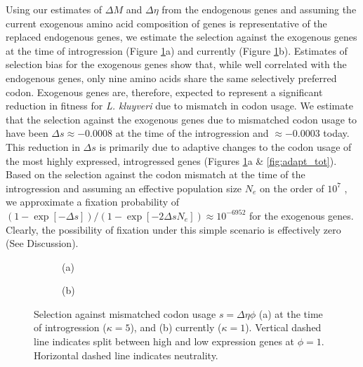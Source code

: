 \documentclass{bmcart}
\def\texttt{[image: ]}
\newcommand{\kluyveri}{\textit{L. kluyveri}\xspace}
\newcommand{\DE}{\ensuremath{{\Delta \eta}}\xspace}
\newcommand{\Ne}{\ensuremath{N_e}\xspace}
\newcommand{\GL}{\ensuremath{{\Delta s}}\xspace}
\begin{document}
Using our estimates of $\Delta M$ and $\Delta \eta$ from the endogenous genes and assuming the current exogenous amino acid composition of genes is representative of the replaced endogenous genes, we estimate the selection against the exogenous genes at the time of introgression (Figure \ref{fig:sne_fitness_burden}a) and currently (Figure \ref{fig:sne_fitness_burden}b).
Estimates of selection bias for the exogenous genes show that, while well correlated with the endogenous genes, only nine amino acids share the same selectively preferred codon.
Exogenous genes are, therefore, expected to represent a significant reduction in fitness for \kluyveri due to mismatch in codon usage.
We estimate that the selection against the exogenous genes due to mismatched codon usage to have been $\GL \approx -0.0008$ at the time of the introgression and $\approx -0.0003$ today.
This reduction in $\GL$ is primarily due to adaptive changes to the codon usage of the most highly expressed, introgressed genes (Figures \ref{fig:sne_fitness_burden}a \& \ref{fig:adapt_tot}).
Based on the selection against the codon mismatch at the time of the introgression and assuming an effective population size $\Ne$ on the order of $10^7$ \citep{wagner2005}, we approximate a fixation probability of $(1-\exp[-\GL])/(1-\exp[-2\GL \Ne]) \approx 10^{-6952}$ \citep{SellaAndHirsh2005} for the exogenous genes.
Clearly, the possibility of fixation under this simple scenario is effectively zero (See Discussion).



\begin{figure}
    \centering
    \begin{subfigure}
        \centering
        (a) %
    \end{subfigure}
    \begin{subfigure}
        \centering
        (b) %
    \end{subfigure}
    \caption{Selection against mismatched codon usage $s = \DE \phi$ (a) at the time of introgression ($\kappa = 5$), and (b) currently ($\kappa = 1$). 
        Vertical dashed line indicates split between high and low expression genes at $\phi = 1$.
    	Horizontal dashed line indicates neutrality.}
    \label{fig:sne_fitness_burden}
\end{figure}
\end{document}
